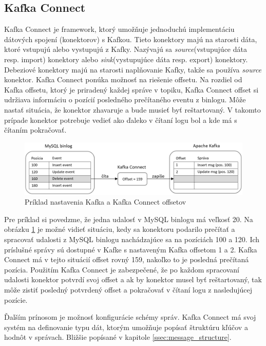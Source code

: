 \subsection{Kafka Connect}\label{kafka_connect}
Kafka Connect je framework, ktorý umožňuje jednoduchú implementáciu dátových spojení (konektorov) s Kafkou. Tieto konektory majú na starosti dáta, ktoré vstupujú alebo vystupujú z Kafky. Nazývajú sa \textit{source}(vstupujúce dáta resp. import) konektory alebo \textit{sink}(vystupujúce dáta resp. export) konektory. Debeziové konektory majú na starosti naplňovanie Kafky, takže sa používa \textit{source} konektor. Kafka Connect ponúka možnosť na riešenie offsetu. Na rozdiel od Kafka offsetu, ktorý je priradený každej správe v topiku, Kafka Connect offset si udržiava informáciu o pozícií posledného prečítaného eventu z binlogu. Môže nastať situácia, že konektor zhavaruje a bude musieť byť reštartovaný. V takomto prípade konektor potrebuje vedieť ako ďaleko v čítaní logu bol a kde má s čítaním pokračovať. 

\begin{figure}[H]
\begin{center}
\includegraphics[width=15cm]{figures/kafka_offsets.PNG}
\caption{Príklad nastavenia Kafka a Kafka Connect offsetov}
\label{fig:kafka_offsets}
\end{center}
\end{figure}

Pre príklad si povedzme, že jedna udalosť v MySQL binlogu má veľkosť 20. Na obrázku \ref{fig:kafka_offsets} je možné vidieť situáciu, kedy sa konektoru podarilo prečítať a spracovať udalosti z MySQL binlogu nachádzajúce sa na pozíciách 100 a 120. Ich príslušné správy sú dostupné v Kafke s nastaveným Kafka offsetom 1 a 2. Kafka Connect má v tejto situácií offset rovný 159, nakoľko to je posledná prečítaná pozícia. Použitím Kafka Connect je zabezpečené, že po každom spracovaní udalosti konektor potvrdí svoj offset a ak by konektor musel byť reštartovaný, tak môže zistiť posledný potvrdený offset a pokračovať v čítaní logu z nasledujúcej pozície.

Ďalším prínosom je možnosť konfigurácie schémy správ. Kafka Connect má svoj systém na definovanie typu dát, ktorým umožňuje popísať štruktúru kľúčov a hodnôt v správach. Bližšie popísané v kapitole \ref{ssec:message_structure}.


